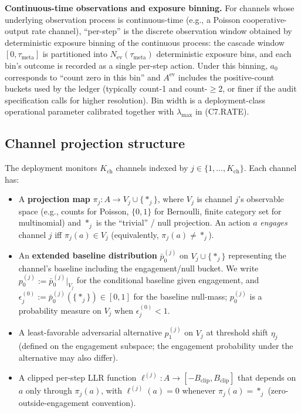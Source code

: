 \documentclass{article}
\newcommand{\Bclip}{B_{\mathrm{clip}}}
\newcommand{\Kch}{K_{\mathrm{ch}}}
\newcommand{\Nev}{N_{\mathrm{ev}}}
\newcommand{\lammax}{\lambda_{\max}}
\newcommand{\taumeta}{\tau_{\mathrm{meta}}}
\begin{document}
\textbf{Continuous-time observations and exposure binning.}  For
channels whose underlying observation process is continuous-time
(e.g., a Poisson cooperative-output rate channel),
``per-step'' is the discrete observation window obtained by
deterministic exposure binning of the continuous process: the
cascade window $[0, \taumeta]$ is partitioned into $\Nev(\taumeta)$
deterministic exposure bins, and each bin's outcome is recorded
as a single per-step action.  Under this binning, $a_0$
corresponds to ``count zero in this bin'' and $A^{\mathrm{ev}}$
includes the positive-count buckets used by the ledger
(typically count-1 and count-$\geq 2$, or finer if the audit
specification calls for higher resolution).  Bin width is a
deployment-class operational parameter calibrated together with
$\lammax$ in (C7.RATE).

\subsection{Channel projection structure}

The deployment monitors $\Kch$ channels indexed by $j \in
\{1, \ldots, \Kch\}$.  Each channel has:
\begin{itemize}
\item A \textbf{projection map} $\pi_j: A \to V_j \cup \{*_j\}$,
  where $V_j$ is channel $j$'s observable space (e.g., counts for
  Poisson, $\{0,1\}$ for Bernoulli, finite category set for
  multinomial) and $*_j$ is the ``trivial'' / null projection.  An
  action $a$ \emph{engages} channel $j$ iff $\pi_j(a) \in V_j$
  (equivalently, $\pi_j(a) \neq *_j$).
\item An \textbf{extended baseline distribution} $\bar{p}_0^{(j)}$
  on $V_j \cup \{*_j\}$ representing the channel's baseline
  including the engagement/null bucket.  We write $p_0^{(j)} :=
  \bar{p}_0^{(j)}|_{V_j}$ for the conditional baseline given
  engagement, and $\epsilon_j^{(0)} := \bar{p}_0^{(j)}(\{*_j\}) \in
  [0, 1]$ for the baseline null-mass; $p_0^{(j)}$ is a probability
  measure on $V_j$ when $\epsilon_j^{(0)} < 1$.
\item A least-favorable adversarial alternative $p_1^{(j)}$ on
  $V_j$ at threshold shift $\eta_j$ (defined on the engagement
  subspace; the engagement probability under the alternative may
  also differ).
\item A clipped per-step LLR function
  $\ell^{(j)}: A \to [-\Bclip, \Bclip]$ that depends on $a$ only
  through $\pi_j(a)$, with $\ell^{(j)}(a) = 0$ whenever $\pi_j(a)
  = *_j$ (zero-outside-engagement convention).
\end{itemize}
\end{document}
